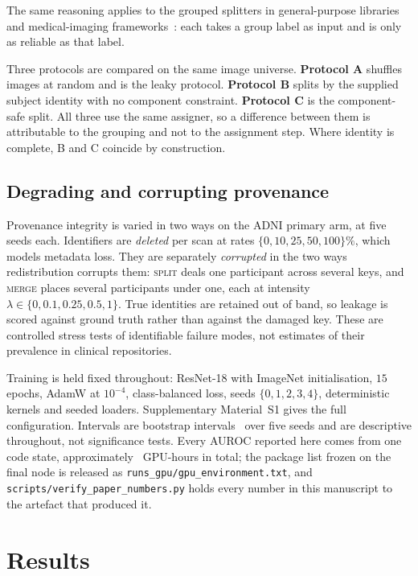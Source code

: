 \documentclass[pdflatex,sn-vancouver-num]{sn-jnl}
\newcommand{\pb}{\discretionary{}{}{}}
\begin{document}
The same reasoning applies to the grouped splitters in general-purpose
libraries and medical-imaging frameworks~\cite{pedregosa2011sklearn,cardoso2022monai}:
each takes a group label as input and is only as reliable as that label.

Three protocols are compared on the same image universe. \textbf{Protocol A}
shuffles images at random and is the leaky protocol. \textbf{Protocol B} splits
by the supplied subject identity with no component constraint. \textbf{Protocol
C} is the component-safe split. All three use the same assigner, so a
difference between them is attributable to the grouping and not to the
assignment step. Where identity is complete, B and C coincide by construction.

\subsection{Degrading and corrupting provenance}
\label{sec:degradation_design}

Provenance integrity is varied in two ways on the ADNI primary arm, at five
seeds each. Identifiers are \emph{deleted} per scan at rates
$\{0, 10, 25, 50, 100\}\%$, which models metadata loss. They are separately
\emph{corrupted} in the two ways redistribution corrupts them: \textsc{split}
deals one participant across several keys, and \textsc{merge} places several
participants under one, each at intensity
$\lambda \in \{0, 0.1, 0.25, 0.5, 1\}$. True identities are retained out of
band, so leakage is scored against ground truth rather than against the damaged
key. These are controlled stress tests of identifiable failure modes, not
estimates of their prevalence in clinical repositories.

Training is held fixed throughout: ResNet-18 with ImageNet initialisation,
$15$ epochs, AdamW at $10^{-4}$, class-balanced loss, seeds
$\{0,1,2,3,4\}$, deterministic kernels and seeded loaders. Supplementary
Material~S1 gives the full configuration. Intervals are bootstrap
intervals~\cite{efron1986bootstrap,carpenter2000bootstrap} over five seeds and
are descriptive throughout, not significance tests. Every AUROC reported here comes from
one code state, approximately \GpuHours{}~GPU-hours in total; the package list
frozen on the final node is released as \texttt{runs\_gpu/\pb gpu\_environment.txt},
and \texttt{scripts/\pb verify\_paper\_numbers.py} holds every number in this
manuscript to the artefact that produced it.

\section{Results}
\label{sec:results}
\end{document}
